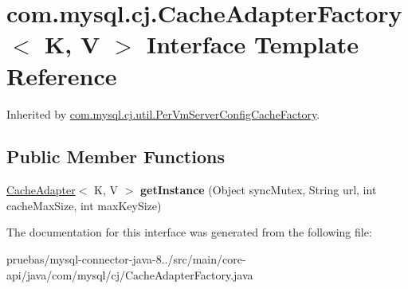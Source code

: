 \hypertarget{interfacecom_1_1mysql_1_1cj_1_1_cache_adapter_factory}{}\section{com.\+mysql.\+cj.\+Cache\+Adapter\+Factory$<$ K, V $>$ Interface Template Reference}
\label{interfacecom_1_1mysql_1_1cj_1_1_cache_adapter_factory}


Inherited by \mbox{\hyperlink{classcom_1_1mysql_1_1cj_1_1util_1_1_per_vm_server_config_cache_factory}{com.\+mysql.\+cj.\+util.\+Per\+Vm\+Server\+Config\+Cache\+Factory}}.

\subsection*{Public Member Functions}
\begin{DoxyCompactItemize}
\item 
\mbox{\label{interfacecom_1_1mysql_1_1cj_1_1_cache_adapter_factory_a6043b2a41c4d79f8a55b11489bf2b0ab}} 
\mbox{\hyperlink{interfacecom_1_1mysql_1_1cj_1_1_cache_adapter}{Cache\+Adapter}}$<$ K, V $>$ {\bfseries get\+Instance} (Object sync\+Mutex, String url, int cache\+Max\+Size, int max\+Key\+Size)
\end{DoxyCompactItemize}


The documentation for this interface was generated from the following file\+:\begin{DoxyCompactItemize}
\item 
pruebas/mysql-\/connector-\/java-\/8../src/main/core-\/api/java/com/mysql/cj/Cache\+Adapter\+Factory.\+java\end{DoxyCompactItemize}
